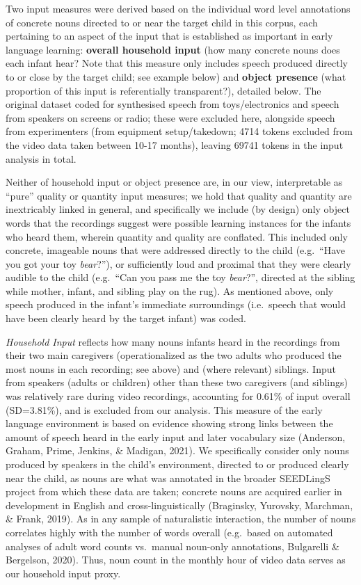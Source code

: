 \documentclass[
  man,mask,floatsintext]{apa6}
\begin{document}
Two input measures were derived based on the individual word level annotations of concrete nouns directed to or near the target child in this corpus, each pertaining to an aspect of the input that is established as important in early language learning: \textbf{overall household input} (how many concrete nouns does each infant hear? Note that this measure only includes speech produced directly to or close by the target child; see example below) and \textbf{object presence} (what proportion of this input is referentially transparent?), detailed below. The original dataset coded for synthesised speech from toys/electronics and speech from speakers on screens or radio; these were excluded here, alongside speech from experimenters (from equipment setup/takedown; 4714 tokens excluded from the video data taken between 10-17 months), leaving 69741 tokens in the input analysis in total.

Neither of household input or object presence are, in our view, interpretable as ``pure'' quality or quantity input measures; we hold that quality and quantity are inextricably linked in general, and specifically we include (by design) only object words that the recordings suggest were possible learning instances for the infants who heard them, wherein quantity and quality are conflated. This included only concrete, imageable nouns that were addressed directly to the child (e.g.~``Have you got your toy \emph{bear}?''), or sufficiently loud and proximal that they were clearly audible to the child (e.g.~``Can you pass me the toy \emph{bear}?'', directed at the sibling while mother, infant, and sibling play on the rug). As mentioned above, only speech produced in the infant's immediate surroundings (i.e.~speech that would have been clearly heard by the target infant) was coded.

\emph{Household Input} reflects how many nouns infants heard in the recordings from their two main caregivers (operationalized as the two adults who produced the most nouns in each recording; see above) and (where relevant) siblings. Input from speakers (adults or children) other than these two caregivers (and siblings) was relatively rare during video recordings, accounting for 0.61\% of input overall (SD=3.81\%), and is excluded from our analysis. This measure of the early language environment is based on evidence showing strong links between the amount of speech heard in the early input and later vocabulary size (Anderson, Graham, Prime, Jenkins, \& Madigan, 2021). We specifically consider only nouns produced by speakers in the child's environment, directed to or produced clearly near the child, as nouns are what was annotated in the broader SEEDLingS project from which these data are taken; concrete nouns are acquired earlier in development in English and cross-linguistically (Braginsky, Yurovsky, Marchman, \& Frank, 2019). As in any sample of naturalistic interaction, the number of nouns correlates highly with the number of words overall (e.g.~based on automated analyses of adult word counts vs.~manual noun-only annotations, Bulgarelli \& Bergelson, 2020). Thus, noun count in the monthly hour of video data serves as our household input proxy.
\end{document}
